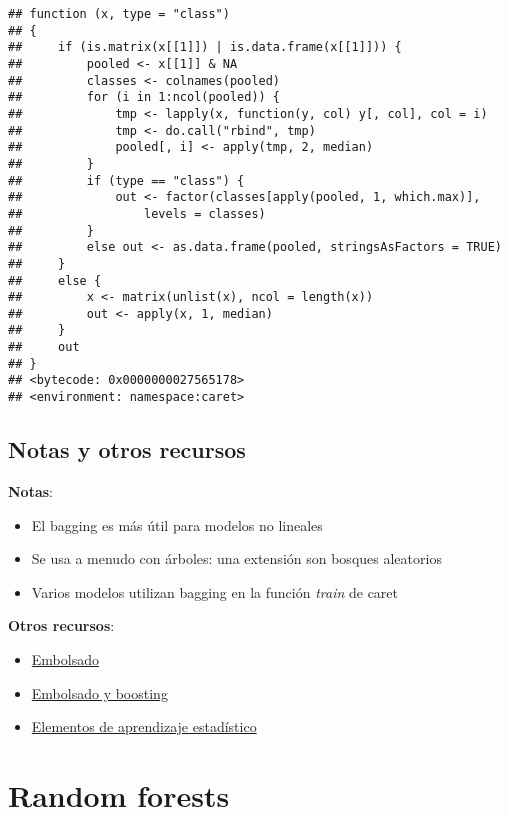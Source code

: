 \documentclass[
]{article}
\providecommand{\tightlist}{%
  \setlength{\itemsep}{0pt}\setlength{\parskip}{0pt}}
\begin{document}
\begin{verbatim}
## function (x, type = "class") 
## {
##     if (is.matrix(x[[1]]) | is.data.frame(x[[1]])) {
##         pooled <- x[[1]] & NA
##         classes <- colnames(pooled)
##         for (i in 1:ncol(pooled)) {
##             tmp <- lapply(x, function(y, col) y[, col], col = i)
##             tmp <- do.call("rbind", tmp)
##             pooled[, i] <- apply(tmp, 2, median)
##         }
##         if (type == "class") {
##             out <- factor(classes[apply(pooled, 1, which.max)], 
##                 levels = classes)
##         }
##         else out <- as.data.frame(pooled, stringsAsFactors = TRUE)
##     }
##     else {
##         x <- matrix(unlist(x), ncol = length(x))
##         out <- apply(x, 1, median)
##     }
##     out
## }
## <bytecode: 0x0000000027565178>
## <environment: namespace:caret>
\end{verbatim}

\hypertarget{notas-y-otros-recursos}{%
\subsection{Notas y otros recursos}\label{notas-y-otros-recursos}}

\textbf{Notas}:

\begin{itemize}
\tightlist
\item
  El bagging es más útil para modelos no lineales
\item
  Se usa a menudo con árboles: una extensión son bosques aleatorios
\item
  Varios modelos utilizan bagging en la función \emph{train} de caret
\end{itemize}

\textbf{Otros recursos}:

\begin{itemize}
\tightlist
\item
  \href{http://en.wikipedia.org/wiki/Bootstrap_aggregating}{Embolsado}
\item
  \href{http://stat.ethz.ch/education/semesters/FS_2008/CompStat/sk-ch8.pdf}{Embolsado
  y boosting}
\item
  \href{http://www-stat.stanford.edu/~tibs/ElemStatLearn/}{Elementos de
  aprendizaje estadístico}
\end{itemize}

\hypertarget{random-forests}{%
\section{Random forests}\label{random-forests}}
\end{document}
